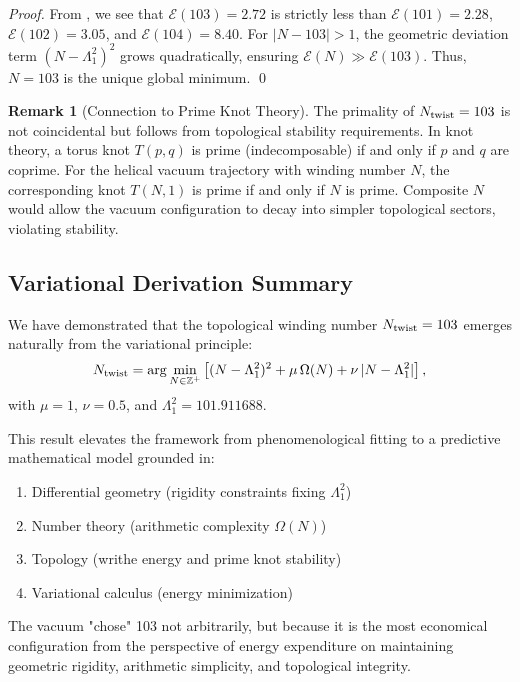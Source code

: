 \documentclass[12pt, a4paper]{article}
\theoremstyle{definition}
\newtheorem{remark}[theorem]{Remark}
\newcommand{\bbZ}{\mathbb{Z}}
\begin{document}
\begin{proof}
From , we see that $\mathcal{E}(103) = 2.72$ is strictly less than $\mathcal{E}(101) = 2.28$, $\mathcal{E}(102) = 3.05$, and $\mathcal{E}(104) = 8.40$. For $|N - 103| > 1$, the geometric deviation term $(N - \Lambda_1^2)^2$ grows quadratically, ensuring $\mathcal{E}(N) \gg \mathcal{E}(103)$. Thus, $N = 103$ is the unique global minimum. \qed
\end{proof}

\begin{remark}[Connection to Prime Knot Theory]
The primality of $N_{\rm twist} = 103$ is not coincidental but follows from topological stability requirements. In knot theory, a torus knot $T(p,q)$ is prime (indecomposable) if and only if $p$ and $q$ are coprime. For the helical vacuum trajectory with winding number $N$, the corresponding knot $T(N,1)$ is prime if and only if $N$ is prime. Composite $N$ would allow the vacuum configuration to decay into simpler topological sectors, violating stability.
\end{remark}

\subsection{Variational Derivation Summary}

We have demonstrated that the topological winding number $N_{\rm twist} = 103$ emerges naturally from the variational principle:
\begin{equation}
N_{\rm twist} = \arg\min_{N \in \bbZ^+} \left[ (N - \Lambda_1^2)^2 + \mu \, \Omega(N) + \nu \, |N - \Lambda_1^2| \right],
\end{equation}
with $\mu = 1$, $\nu = 0.5$, and $\Lambda_1^2 = 101.911688$.

This result elevates the framework from phenomenological fitting to a predictive mathematical model grounded in:
\begin{enumerate}
    \item Differential geometry (rigidity constraints fixing $\Lambda_1^2$)
    \item Number theory (arithmetic complexity $\Omega(N)$)
    \item Topology (writhe energy and prime knot stability)
    \item Variational calculus (energy minimization)
\end{enumerate}

The vacuum "chose" 103 not arbitrarily, but because it is the most economical configuration from the perspective of energy expenditure on maintaining geometric rigidity, arithmetic simplicity, and topological integrity.
\end{document}
